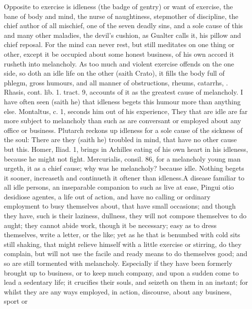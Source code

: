 {{Opposite to exercise is idleness (the badge of gentry) or want of
exercise, the bane of body and mind, the nurse of naughtiness,
stepmother of discipline, the chief author of all mischief, one of the
seven deadly sins, and a sole cause of this and many other maladies,
the devil's cushion, as Gualter calls it, his pillow and chief
reposal. For the mind can never rest, but still meditates on one thing
or other, except it be occupied about some honest business, of his own
accord it rusheth into melancholy. As too much and violent
exercise offends on the one side, so doth an idle life on the other
(saith Crato), it fills the body full of phlegm, gross humours, and all
manner of obstructions, rheums, catarrhs, \etc{}. Rhasis, cont. lib. 1.
tract. 9, accounts of it as the greatest cause of melancholy. I
have often seen (saith he) that idleness begets this humour more than
anything else. Montaltus, c. 1, seconds him out of his experience,
They that are idle are far more subject to melancholy than such
as are conversant or employed about any office or business.
Plutarch reckons up idleness for a sole cause of the sickness of
the soul: There are they (saith he) troubled in mind, that have no
other cause but this. Homer, Iliad. 1, brings in Achilles eating of his
own heart in his idleness, because he might not fight. Mercurialis,
consil. 86, for a melancholy young man urgeth, it as a chief
cause; why was he melancholy? because idle. Nothing begets it sooner,
increaseth and continueth it oftener than idleness.A disease
familiar to all idle persons, an inseparable companion to such as live
at ease, Pingui otio desidiose agentes, a life out of action, and have
no calling or ordinary employment to busy themselves about, that have
small occasions; and though they have, such is their laziness,
dullness, they will not compose themselves to do aught; they cannot
abide work, though it be necessary; easy as to dress themselves, write
a letter, or the like; yet as he that is benumbed with cold sits still
shaking, that might relieve himself with a little exercise or stirring,
do they complain, but will not use the facile and ready means to do
themselves good; and so are still tormented with melancholy. Especially
if they have been formerly brought up to business, or to keep much
company, and upon a sudden come to lead a sedentary life; it crucifies
their souls, and seizeth on them in an instant; for whilst they are any
ways employed, in action, discourse, about any business, sport or
}}

